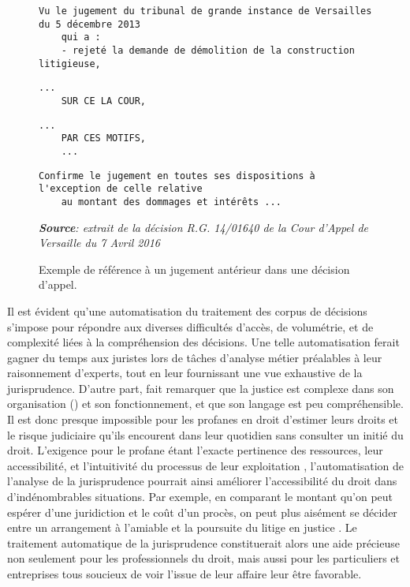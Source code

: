 \begin{figure}[!htb]
\begin{Verbatim}[firstnumber=73]
    Vu le jugement du tribunal de grande instance de Versailles du 5 décembre 2013 
    qui a :
    - rejeté la demande de démolition de la construction litigieuse,
\end{Verbatim}
\begin{Verbatim}[firstnumber=118, stepnumber=2]
    ...
    SUR CE LA COUR,
\end{Verbatim}
\begin{Verbatim}[firstnumber=277, stepnumber=2]
    ...  
    PAR CES MOTIFS, 
    ...
\end{Verbatim}
\begin{Verbatim}[firstnumber=281]
    Confirme le jugement en toutes ses dispositions à l'exception de celle relative 
    au montant des dommages et intérêts ...
\end{Verbatim}
\scriptsize{\textit{\textbf{Source}: extrait de la décision R.G. 14/01640 de la Cour d'Appel de Versaille du 7 Avril 2016}}
  \caption{Exemple de référence à un jugement antérieur dans une décision d'appel.}
  \label{fig:intro:referencejugementanterieur}
\end{figure}
Il est évident qu'une automatisation du traitement des corpus de décisions s'impose pour répondre aux diverses difficultés d'accès, de volumétrie, et de complexité liées à la compréhension des décisions. Une telle automatisation ferait gagner du temps aux juristes lors de tâches d'analyse métier préalables à leur raisonnement d'experts, tout en leur fournissant une vue exhaustive de la jurisprudence. D'autre part, \citet{cretin2014justicecomplexe} fait remarquer que la justice est complexe dans son organisation () et son fonctionnement, et que son langage est peu compréhensible. Il est donc presque impossible pour les profanes en droit d'estimer leurs droits et le risque judiciaire qu'ils encourent dans leur quotidien sans consulter un initié du droit. L'exigence pour le profane étant l'exacte pertinence des ressources, leur accessibilité, et l'intuitivité du processus de leur exploitation \citep{narazenko2017legalnlpintro}, l'automatisation de l'analyse de la jurisprudence pourrait ainsi améliorer l'accessibilité du droit dans d'indénombrables situations. Par exemple, en comparant le montant qu'on peut espérer d'une juridiction et le coût d'un procès, on peut plus aisément se décider entre un arrangement à l'amiable et la poursuite du litige en justice \citep{langlaischappe2009ecoresolutionlitige}. Le traitement automatique de la jurisprudence constituerait alors une aide précieuse non seulement pour les professionnels du droit, mais aussi pour les particuliers et entreprises tous soucieux de voir l'issue de leur affaire leur être favorable.  


